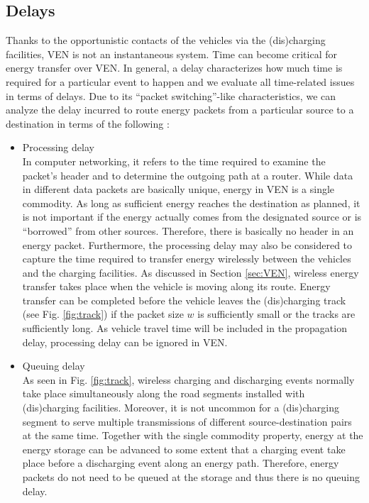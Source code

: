 \documentclass[journal]{IEEEtran}
\begin{document}
\subsection{Delays}
Thanks to the opportunistic contacts of the vehicles via the (dis)charging facilities, VEN is not an instantaneous system. Time can become critical for energy transfer over VEN. In general, a delay characterizes how much time is required for a particular event to happen and we evaluate all time-related issues in terms of delays.
Due to its ``packet switching''-like characteristics, we can analyze the delay incurred to route energy packets from a particular source to a destination in terms of the following \cite{networking}:
\begin{itemize}
	\item Processing delay\\
	In computer networking, it refers to the time required to examine the packet's header and to determine the outgoing path at a router. While data in different data packets are basically unique, energy in VEN is a single commodity. As long as sufficient energy reaches the destination as planned, it is not important if the energy actually comes from the designated source or is ``borrowed'' from other sources. Therefore, there is basically no header in an energy packet. Furthermore, the processing delay may also be considered to capture the time required to transfer energy wirelessly between the vehicles and the charging facilities. As discussed in Section \ref{sec:VEN}, wireless energy transfer takes place when the vehicle is moving along its route. Energy transfer can be completed before the vehicle leaves the (dis)charging track (see Fig. \ref{fig:track}) if the packet size $w$ is sufficiently small or the tracks are sufficiently long. As vehicle travel time will be included in the propagation delay, processing delay can be ignored in VEN.
	\item Queuing delay\\
	As seen in Fig. \ref{fig:track}, wireless charging and discharging events normally take place simultaneously along the road segments installed with (dis)charging facilities. Moreover, it is not uncommon for a (dis)charging segment to serve multiple transmissions of different source-destination pairs at the same time. Together with the single commodity property, energy at the energy storage can be advanced to some extent that a charging event take place before a discharging event along an energy path. Therefore, energy packets do not need to be queued at the storage and thus there is no queuing delay.

\end{itemize}
\end{document}
